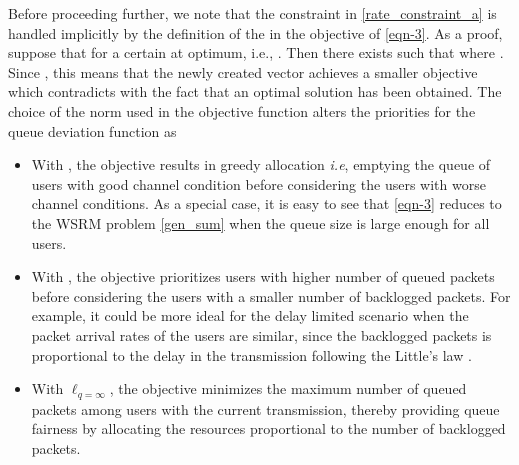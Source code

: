 Before proceeding further, we note that the constraint in \eqref{rate_constraint_a} is handled implicitly by the definition of the  in the objective of \eqref{eqn-3}. As a proof, suppose that  for a certain  at optimum, i.e., . Then there exists  such that  where . Since , this means that the newly created vector  achieves a smaller objective which contradicts with the fact that an optimal solution has been obtained. The choice of the norm  used in the objective function \cite{berry2004cross,qps_cioffi} alters the priorities for the queue deviation function as
\begin{itemize}
\item With , the objective results in greedy allocation \textit{i.e}, emptying the queue of users with good channel condition before considering the users with worse channel conditions. As a special case, it is easy to see that \eqref{eqn-3} reduces to the \ac{WSRM} problem \eqref{gen_sum} when the queue size is large enough for all users.
\item With , the objective prioritizes users with higher number of queued packets before considering the users with a smaller number of backlogged packets. For example, it could be more ideal for the delay limited scenario when the packet arrival rates of the users are similar, since the backlogged packets is proportional to the delay in the transmission following the Little's law \cite{neely2010stochastic}.
\item With \(\ell_{q = \infty} \), the objective minimizes the maximum number of queued packets among users with the current transmission, thereby providing queue fairness by allocating the resources proportional to the number of backlogged packets.
\end{itemize} 